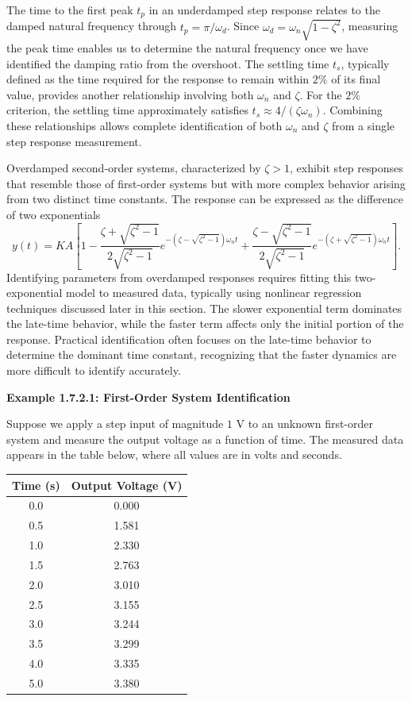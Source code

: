 The time to the first peak $t_p$ in an underdamped step response relates to the damped natural frequency through $t_p = \pi/\omega_d$. Since $\omega_d = \omega_n\sqrt{1-\zeta^2}$, measuring the peak time enables us to determine the natural frequency once we have identified the damping ratio from the overshoot. The settling time $t_s$, typically defined as the time required for the response to remain within $2\%$ of its final value, provides another relationship involving both $\omega_n$ and $\zeta$. For the $2\%$ criterion, the settling time approximately satisfies $t_s \approx 4/(\zeta\omega_n)$. Combining these relationships allows complete identification of both $\omega_n$ and $\zeta$ from a single step response measurement.

Overdamped second-order systems, characterized by $\zeta > 1$, exhibit step responses that resemble those of first-order systems but with more complex behavior arising from two distinct time constants. The response can be expressed as the difference of two exponentials
\[
y(t) = KA\left[1 - \frac{\zeta + \sqrt{\zeta^2-1}}{2\sqrt{\zeta^2-1}}e^{-(\zeta-\sqrt{\zeta^2-1})\omega_n t} + \frac{\zeta - \sqrt{\zeta^2-1}}{2\sqrt{\zeta^2-1}}e^{-(\zeta+\sqrt{\zeta^2-1})\omega_n t}\right].
\]
Identifying parameters from overdamped responses requires fitting this two-exponential model to measured data, typically using nonlinear regression techniques discussed later in this section. The slower exponential term dominates the late-time behavior, while the faster term affects only the initial portion of the response. Practical identification often focuses on the late-time behavior to determine the dominant time constant, recognizing that the faster dynamics are more difficult to identify accurately.

\textbf{Example 1.7.2.1: First-Order System Identification}

Suppose we apply a step input of magnitude $1$ V to an unknown first-order system and measure the output voltage as a function of time. The measured data appears in the table below, where all values are in volts and seconds.

\begin{table}[htbp]
\centering
\begin{tabular}{|c|c|}
\hline
Time (s) & Output Voltage (V) \\
\hline
0.0 & 0.000 \\
\hline
0.5 & 1.581 \\
\hline
1.0 & 2.330 \\
\hline
1.5 & 2.763 \\
\hline
2.0 & 3.010 \\
\hline
2.5 & 3.155 \\
\hline
3.0 & 3.244 \\
\hline
3.5 & 3.299 \\
\hline
4.0 & 3.335 \\
\hline
5.0 & 3.380 \\
\hline
\end{tabular}
\label{tab:first_order_data}
\end{table}

